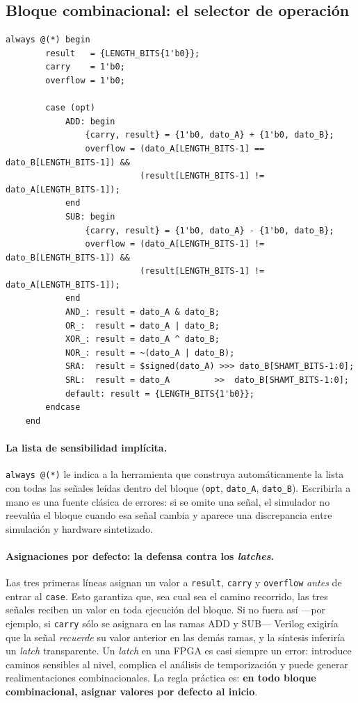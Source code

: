 \documentclass[12pt,a4paper]{article}
\begin{document}
\subsection{Bloque combinacional: el selector de operación}

\begin{lstlisting}[caption={Núcleo combinacional de la ALU.},label={lst:comb}]
    always @(*) begin
        result   = {LENGTH_BITS{1'b0}};
        carry    = 1'b0;
        overflow = 1'b0;

        case (opt)
            ADD: begin
                {carry, result} = {1'b0, dato_A} + {1'b0, dato_B};
                overflow = (dato_A[LENGTH_BITS-1] == dato_B[LENGTH_BITS-1]) &&
                           (result[LENGTH_BITS-1] != dato_A[LENGTH_BITS-1]);
            end
            SUB: begin
                {carry, result} = {1'b0, dato_A} - {1'b0, dato_B};
                overflow = (dato_A[LENGTH_BITS-1] != dato_B[LENGTH_BITS-1]) &&
                           (result[LENGTH_BITS-1] != dato_A[LENGTH_BITS-1]);
            end
            AND_: result = dato_A & dato_B;
            OR_:  result = dato_A | dato_B;
            XOR_: result = dato_A ^ dato_B;
            NOR_: result = ~(dato_A | dato_B);
            SRA:  result = $signed(dato_A) >>> dato_B[SHAMT_BITS-1:0];
            SRL:  result = dato_A         >>  dato_B[SHAMT_BITS-1:0];
            default: result = {LENGTH_BITS{1'b0}};
        endcase
    end
\end{lstlisting}

\paragraph{La lista de sensibilidad implícita.} \texttt{always @(*)} le indica a la
herramienta que construya automáticamente la lista con todas las señales leídas dentro del
bloque (\texttt{opt}, \texttt{dato\_A}, \texttt{dato\_B}). Escribirla a mano es una fuente
clásica de errores: si se omite una señal, el simulador no reevalúa el bloque cuando esa
señal cambia y aparece una discrepancia entre simulación y hardware sintetizado.

\paragraph{Asignaciones por defecto: la defensa contra los \textit{latches}.} Las tres
primeras líneas asignan un valor a \texttt{result}, \texttt{carry} y \texttt{overflow}
\emph{antes} de entrar al \texttt{case}. Esto garantiza que, sea cual sea el camino
recorrido, las tres señales reciben un valor en toda ejecución del bloque. Si no fuera así
---por ejemplo, si \texttt{carry} sólo se asignara en las ramas ADD y SUB--- Verilog
exigiría que la señal \emph{recuerde} su valor anterior en las demás ramas, y la síntesis
inferiría un \textit{latch} transparente. Un \textit{latch} en una FPGA es casi siempre un
error: introduce caminos sensibles al nivel, complica el análisis de temporización y puede
generar realimentaciones combinacionales. La regla práctica es: \textbf{en todo bloque
combinacional, asignar valores por defecto al inicio}.
\end{document}
